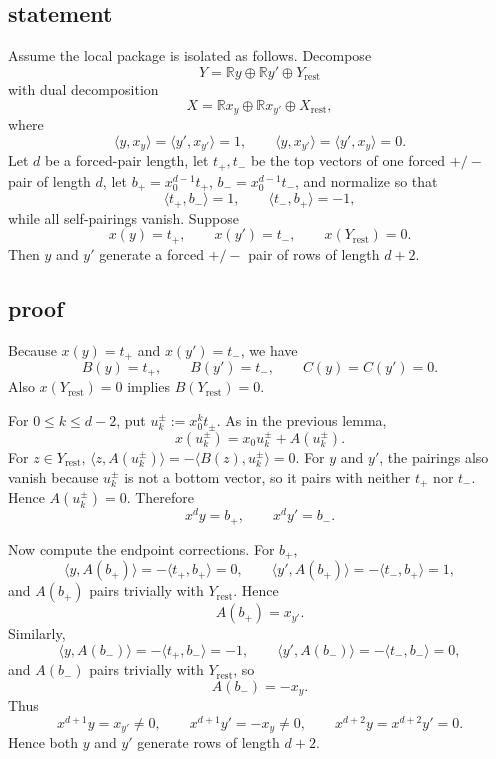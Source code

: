 \documentclass[
]{article}
\begin{document}
\subsection{statement}\label{statement-7}

Assume the local package is isolated as follows. Decompose \[
Y=\mathbb R y\oplus \mathbb R y'\oplus Y_{\mathrm{rest}}
\] with dual decomposition \[
X=\mathbb R x_y\oplus \mathbb R x_{y'}\oplus X_{\mathrm{rest}},
\] where \[
\langle y,x_y\rangle=\langle y',x_{y'}\rangle=1,\qquad
\langle y,x_{y'}\rangle=\langle y',x_y\rangle=0.
\] Let \(d\) be a forced-pair length, let \(t_+,t_-\) be the top vectors
of one forced \(+/-\) pair of length \(d\), let \(b_+=x_0^{d-1}t_+\),
\(b_-=x_0^{d-1}t_-\), and normalize so that \[
\langle t_+,b_-\rangle=1,\qquad \langle t_-,b_+\rangle=-1,
\] while all self-pairings vanish. Suppose \[
x(y)=t_+,\qquad x(y')=t_-,\qquad x(Y_{\mathrm{rest}})=0.
\] Then \(y\) and \(y'\) generate a forced \(+/-\) pair of rows of
length \(d+2\).

\subsection{proof}\label{proof-7}

Because \(x(y)=t_+\) and \(x(y')=t_-\), we have \[
B(y)=t_+,\qquad B(y')=t_-,\qquad C(y)=C(y')=0.
\] Also \(x(Y_{\mathrm{rest}})=0\) implies \(B(Y_{\mathrm{rest}})=0\).

For \(0\le k\le d-2\), put \(u_k^\pm:=x_0^k t_\pm\). As in the previous
lemma, \[
x(u_k^\pm)=x_0u_k^\pm+A(u_k^\pm).
\] For \(z\in Y_{\mathrm{rest}}\),
\(\langle z,A(u_k^\pm)\rangle=-\langle B(z),u_k^\pm\rangle=0\). For
\(y\) and \(y'\), the pairings also vanish because \(u_k^\pm\) is not a
bottom vector, so it pairs with neither \(t_+\) nor \(t_-\). Hence
\(A(u_k^\pm)=0\). Therefore \[
x^d y=b_+,\qquad x^d y'=b_-.
\]

Now compute the endpoint corrections. For \(b_+\), \[
\langle y,A(b_+)\rangle=-\langle t_+,b_+\rangle=0,\qquad
\langle y',A(b_+)\rangle=-\langle t_-,b_+\rangle=1,
\] and \(A(b_+)\) pairs trivially with \(Y_{\mathrm{rest}}\). Hence \[
A(b_+)=x_{y'}.
\] Similarly, \[
\langle y,A(b_-)\rangle=-\langle t_+,b_-\rangle=-1,\qquad
\langle y',A(b_-)\rangle=-\langle t_-,b_-\rangle=0,
\] and \(A(b_-)\) pairs trivially with \(Y_{\mathrm{rest}}\), so \[
A(b_-)=-x_y.
\] Thus \[
x^{d+1}y=x_{y'}\neq 0,\qquad x^{d+1}y'=-x_y\neq 0,
\qquad x^{d+2}y=x^{d+2}y'=0.
\] Hence both \(y\) and \(y'\) generate rows of length \(d+2\).
\end{document}
